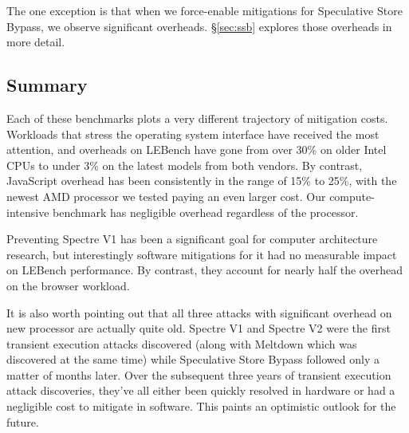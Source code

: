 The one exception is that when we force-enable mitigations for Speculative Store Bypass, we observe significant overheads.
\S\ref{sec:ssb} explores those overheads in more detail.

\subsection{Summary}
Each of these benchmarks plots a very different trajectory of mitigation costs.
Workloads that stress the operating system interface have received the most attention, and overheads on LEBench have gone from over 30\% on older Intel CPUs to under 3\% on the latest models from both vendors.
By contrast, JavaScript overhead has been consistently in the range of 15\% to 25\%, with the newest AMD processor we tested paying an even larger cost.
Our compute-intensive benchmark has negligible overhead regardless of the processor.

Preventing Spectre V1 has been a significant goal for computer architecture research, but interestingly software mitigations for it had no measurable impact on LEBench performance.
By contrast, they account for nearly half the overhead on the browser workload.

It is also worth pointing out that all three attacks with significant overhead on new processor are actually quite old.
Spectre V1 and Spectre V2 were the first transient execution attacks discovered (along with Meltdown which was discovered at the same time) while Speculative Store Bypass followed only a matter of months later.
Over the subsequent three years of transient execution attack discoveries, they've all either been quickly resolved in hardware or had a negligible cost to mitigate in software.
This paints an optimistic outlook for the future.
